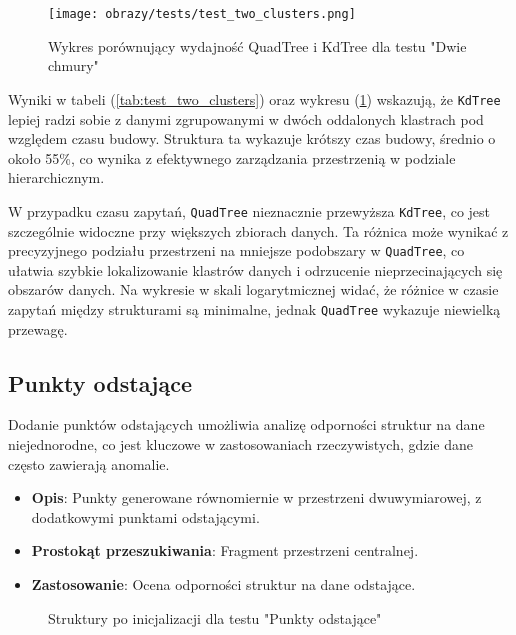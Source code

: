 \documentclass[12pt]{article}
\begin{document}
\begin{figure}[h]
    \centering
    \texttt{[image: obrazy/tests/test\_two\_clusters.png]}
    \caption{Wykres porównujący wydajność QuadTree i KdTree dla testu "Dwie chmury"}
    \label{fig:two_clusters_tests}
\end{figure}
\newpage
\noindent Wyniki w tabeli (\ref{tab:test_two_clusters}) oraz wykresu (\ref{fig:two_clusters_tests}) wskazują, że \texttt{KdTree} lepiej radzi sobie z danymi zgrupowanymi w dwóch oddalonych klastrach pod względem czasu budowy. Struktura ta wykazuje krótszy czas budowy, średnio o około 55\%, co wynika z efektywnego zarządzania przestrzenią w podziale hierarchicznym.

\noindent W przypadku czasu zapytań, \texttt{QuadTree} nieznacznie przewyższa \texttt{KdTree}, co jest szczególnie widoczne przy większych zbiorach danych. Ta różnica może wynikać z precyzyjnego podziału przestrzeni na mniejsze podobszary w \texttt{QuadTree}, co ułatwia szybkie lokalizowanie klastrów danych i odrzucenie nieprzecinających się obszarów danych. Na wykresie w skali logarytmicznej widać, że różnice w czasie zapytań między strukturami są minimalne, jednak \texttt{QuadTree} wykazuje niewielką przewagę.


\newpage
\subsection{Punkty odstające}
Dodanie punktów odstających umożliwia analizę odporności struktur na dane niejednorodne, co jest kluczowe w zastosowaniach rzeczywistych, gdzie dane często zawierają anomalie.
\begin{itemize}
    \item \textbf{Opis}: Punkty generowane równomiernie w przestrzeni dwuwymiarowej, z dodatkowymi punktami odstającymi.
    \item \textbf{Prostokąt przeszukiwania}: Fragment przestrzeni centralnej.
    \item \textbf{Zastosowanie}: Ocena odporności struktur na dane odstające.
\end{itemize}

\begin{figure}[h]
    \centering
    \qquad
    \caption{Struktury po inicjalizacji dla testu "Punkty odstające"}%
    \label{fig:outliers}%
\end{figure}
\end{document}

